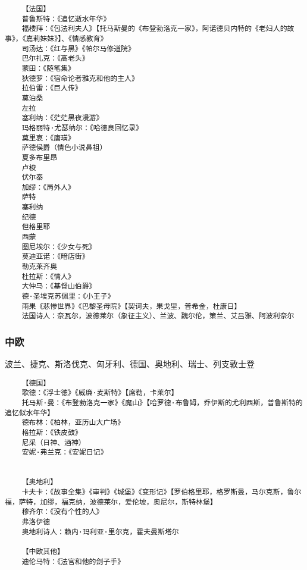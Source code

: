 \documentclass[UTF8]{../RepresentationUniverse}
\begin{document}
\begin{lstlisting}
    【法国】
    普鲁斯特：《追忆逝水年华》
    福楼拜：《包法利夫人》【托马斯曼的《布登勃洛克一家》，阿诺德贝内特的《老妇人的故事》，《嘉莉妹妹》】、《情感教育》
    司汤达：《红与黑》《帕尔马修道院》
    巴尔扎克：《高老头》
    蒙田：《随笔集》
    狄德罗：《宿命论者雅克和他的主人》
    拉伯雷：《巨人传》
    莫泊桑
    左拉
    塞利纳：《茫茫黑夜漫游》
    玛格丽特·尤瑟纳尔：《哈德良回忆录》
    莫里哀：《唐璜》
    萨德侯爵（情色小说鼻祖）
    夏多布里昂
    卢梭
    伏尔泰
    加缪：《局外人》
    萨特
    塞利纳
    纪德
    但格里耶
    西蒙
    图尼埃尔：《少女与死》
    莫迪亚诺：《暗店街》
    勒克莱齐奥
    杜拉斯：《情人》
    大仲马：《基督山伯爵》
    德·圣埃克苏佩里：《小王子》
    雨果《悲惨世界》《巴黎圣母院》【契诃夫，果戈里，普希金，杜康日】
    法国诗人：奈瓦尔，波德莱尔（象征主义）、兰波、魏尔伦，策兰、艾吕雅、阿波利奈尔
\end{lstlisting}

\subsubsection{中欧}
波兰、捷克、斯洛伐克、匈牙利、德国、奥地利、瑞士、列支敦士登
\begin{lstlisting}
    【德国】
    歌德：《浮士德》《威廉·麦斯特》【席勒，卡莱尔】
    托马斯·曼：《布登勃洛克一家》《魔山》【哈罗德·布鲁姆，乔伊斯的尤利西斯，普鲁斯特的追忆似水年华】
    德布林：《柏林，亚历山大广场》
    格拉斯：《铁皮鼓》
    尼采（日神、酒神）
    安妮·弗兰克：《安妮日记》


    【奥地利】
    卡夫卡：《故事全集》《审判》《城堡》《变形记》【罗伯格里耶，格罗斯曼，马尔克斯，鲁尔福，萨特，加缪，福克纳，波德莱尔，爱伦坡，奥尼尔，斯特林堡】
    穆齐尔：《没有个性的人》
    弗洛伊德
    奥地利诗人：赖内·玛利亚·里尔克，霍夫曼斯塔尔

    【中欧其他】
    迪伦马特：《法官和他的刽子手》
\end{lstlisting}
\end{document}
